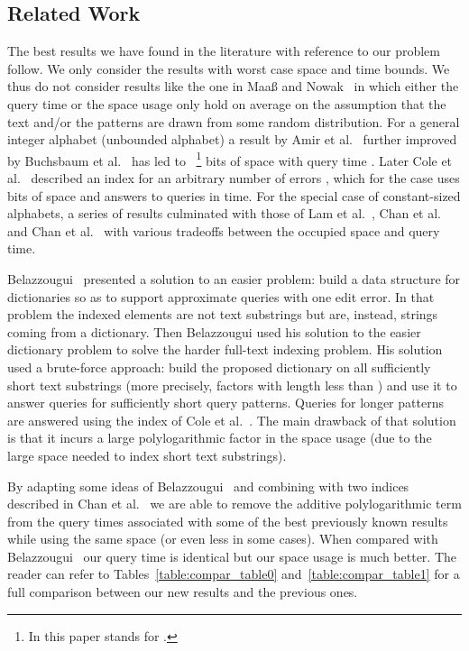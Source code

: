 \documentclass{article}
\newcommand{\?}{\mskip1.5mu}
\begin{document}
\subsection{Related Work}
The best results we have found in the literature with reference to our problem follow. We only consider the results with worst case space and time bounds. We thus do not consider results like the one in Maa{\ss} and Nowak~\cite{MN05} in which either the query time or the space usage only hold on average on the assumption that the text and/or the patterns are drawn from some random distribution. 
For a general integer alphabet (unbounded alphabet) a result by Amir et al.~\cite{AKLLLR00} further improved by Buchsbaum et al.~\cite{BGW00} has led to ~\footnote{In this paper  stands for .} bits of space with query time . Later Cole et al.~\cite{CGL04} described an index for an arbitrary number of errors , which for the case  uses  bits of space and answers to queries in  time. For the special case of constant-sized alphabets, a series of results culminated with those of Lam et al.~\cite{LSW08}, Chan et al.~\cite{chan2011linear} and Chan et al.~\cite{CLSTW10} with various tradeoffs between the occupied space and query time. 

Belazzougui~\cite{B09} presented a solution to an easier problem: build a data structure for dictionaries so as to support approximate queries with one edit error. In that problem the indexed elements are not text substrings but are, instead, strings coming from a dictionary. Then Belazzougui used his solution to the easier dictionary problem to solve the harder full-text indexing problem. His solution used a brute-force approach: build the proposed dictionary on all sufficiently short text substrings (more precisely, factors with length less than ) and use it to answer queries for sufficiently short query patterns. Queries for longer patterns are answered using the index of Cole et al.~\cite{CGL04}. The main drawback of that solution is that it incurs a large polylogarithmic factor in the space usage (due to the large space needed to index short text substrings). 

By adapting some ideas of Belazzougui~\cite{B09} and combining with two indices described in Chan et al.~\cite{chan2011linear} we are able to remove the additive polylogarithmic term from the query times associated with some of the best previously known results while using the same space (or even less in some cases). When compared with Belazzougui~\cite{B09} our query time is identical but our space usage is much better. 
The reader can refer to Tables~\ref{table:compar_table0} and~\ref{table:compar_table1} for a full comparison between our new results and the previous ones. 
\end{document}
